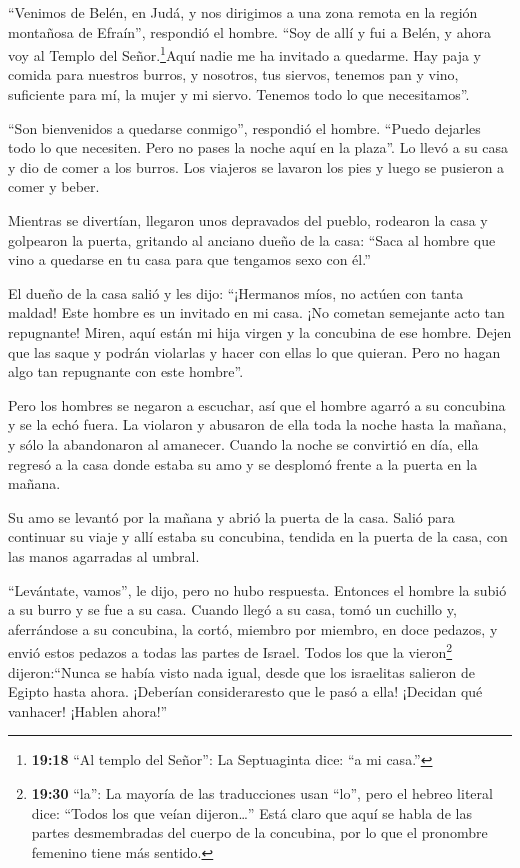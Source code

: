  ``Venimos de Belén, en Judá, y nos dirigimos a una zona
remota en la región montañosa de Efraín'', respondió el hombre. ``Soy de
allí y fui a Belén, y ahora voy al Templo del Señor.\footnote{\textbf{19:18}
  ``Al templo del Señor'': La Septuaginta dice: ``a mi casa.''}Aquí
nadie me ha invitado a quedarme.  Hay paja y comida para
nuestros burros, y nosotros, tus siervos, tenemos pan y vino, suficiente
para mí, la mujer y mi siervo. Tenemos todo lo que necesitamos''.

 ``Son bienvenidos a quedarse conmigo'', respondió el
hombre. ``Puedo dejarles todo lo que necesiten. Pero no pases la noche
aquí en la plaza''.  Lo llevó a su casa y dio de comer a
los burros. Los viajeros se lavaron los pies y luego se pusieron a comer
y beber.

 Mientras se divertían, llegaron unos depravados del
pueblo, rodearon la casa y golpearon la puerta, gritando al anciano
dueño de la casa: ``Saca al hombre que vino a quedarse en tu casa para
que tengamos sexo con él.''

 El dueño de la casa salió y les dijo: ``¡Hermanos míos, no
actúen con tanta maldad! Este hombre es un invitado en mi casa. ¡No
cometan semejante acto tan repugnante!  Miren, aquí están
mi hija virgen y la concubina de ese hombre. Dejen que las saque y
podrán violarlas y hacer con ellas lo que quieran. Pero no hagan algo
tan repugnante con este hombre''.

 Pero los hombres se negaron a escuchar, así que el hombre
agarró a su concubina y se la echó fuera. La violaron y abusaron de ella
toda la noche hasta la mañana, y sólo la abandonaron al amanecer.
 Cuando la noche se convirtió en día, ella regresó a la
casa donde estaba su amo y se desplomó frente a la puerta en la mañana.

 Su amo se levantó por la mañana y abrió la puerta de la
casa. Salió para continuar su viaje y allí estaba su concubina, tendida
en la puerta de la casa, con las manos agarradas al umbral.

 ``Levántate, vamos'', le dijo, pero no hubo respuesta.
Entonces el hombre la subió a su burro y se fue a su casa. 
Cuando llegó a su casa, tomó un cuchillo y, aferrándose a su concubina,
la cortó, miembro por miembro, en doce pedazos, y envió estos pedazos a
todas las partes de Israel.  Todos los que la
vieron\footnote{\textbf{19:30} ``la'': La mayoría de las traducciones
  usan ``lo'', pero el hebreo literal dice: ``Todos los que veían
  dijeron\ldots{}'' Está claro que aquí se habla de las partes
  desmembradas del cuerpo de la concubina, por lo que el pronombre
  femenino tiene más sentido.} dijeron:``Nunca se había visto nada
igual, desde que los israelitas salieron de Egipto hasta ahora.
¡Deberían consideraresto que le pasó a ella! ¡Decidan qué vanhacer!
¡Hablen ahora!''

